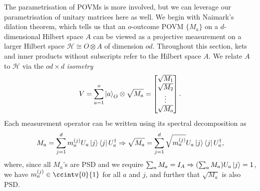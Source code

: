 \documentclass[10pt, a4paper]{article}
\numberwithin{equation}{section} %
\theoremstyle{definition}
\theoremstyle{plain}
\newcommand{\?}{\mathrel{?}} %
\newcommand{\Hs}{\mathcal{H}} %
\begin{document}
                  The parametrisation of POVMs is more involved, but we can leverage our parametrisation of unitary matrices here as well. We begin with Naimark's dilation theorem, which tells us that an \(o\)-outcome POVM \(\{M_a\}\) on a \(d\)-dimensional Hilbert space \(A\) can be viewed as a projective measurement on a larger Hilbert space \(\Hs \cong O \otimes A\) of dimension \(od\). Throughout this section, kets and inner products without subscripts refer to the Hilbert space \(A\). We relate \(A\) to \(\Hs\) via the \(od \times d\) \emph{isometry}
                  \begin{equation}
                    V = \sum_{a=1}^o \ket{a}_O \otimes \sqrt{M_a} = \begin{bmatrix} \sqrt{M_1} \\ \sqrt{M_2} \\ \vdots \\ \sqrt{M_o} \end{bmatrix}.
                  \end{equation}
                  Each measurement operator can be written using its spectral decomposition as
                  \begin{equation}
                    M_a = \sum_{j=1}^d m_a^{(j)} U_a \ket{j}\bra{j} U_a^{\dagger} \Rightarrow \sqrt{M_a} = \sum_{j=1}^d \sqrt{m_a^{(j)}} U_a \ket{j}\bra{j} U_a^{\dagger},
                  \end{equation}
                  where, since all \(M_a\)'s are PSD and we require \(\sum_a M_a = I_A \Rightarrow (\sum_a M_a) U_a\ket{j} = 1\), we have \(m_a^{(j)}\in\ccintv{0}{1}\) for all \(a\) and \(j\), and further that \(\sqrt{M_a}\) is also PSD\@.
\end{document}
